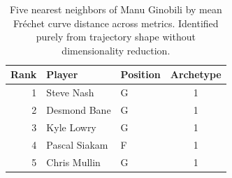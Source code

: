 \begin{table}[htbp]
  \centering\small
  \begin{tabular}{rllc}
    \toprule
    Rank & Player & Position & Archetype \\
    \midrule
    1 & Steve Nash & G & 1 \\
    2 & Desmond Bane & G & 1 \\
    3 & Kyle Lowry & G & 1 \\
    4 & Pascal Siakam & F & 1 \\
    5 & Chris Mullin & G & 1 \\
    \bottomrule
  \end{tabular}
  \caption{Five nearest neighbors of Manu Ginobili by mean Fr\'{e}chet curve distance across metrics. Identified purely from trajectory shape without dimensionality reduction.}
  \label{tab:Manu_Ginobili_frechet_curve_neighbors}
\end{table}

